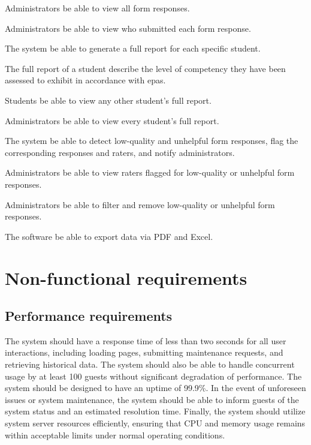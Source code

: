 \documentclass[letterpaper,article,oneside]{memoir}
\begin{document}
\begin{requirements}
   Administrators  be able to view all \glspl{form response}.
   \dep{\ref{req:r3}}
  
   Administrators  be able to view who submitted each \gls{form response}.
   \dep{\ref{req:a1}}

   The system  be able to generate a full report for each specific \gls{student}.
   \dep{\ref{req:r3}}

   The full report of a student  describe the level of \gls{competency} they have been assessed to exhibit in accordance with \glspl{epa}.
   \dep{\ref{req:r3}, \ref{req:s1}}

   Students  be able to view any other \gls{student}'s full report.
   \dep{\ref{req:s1}}

   Administrators  be able to view every \gls{student}'s full report.
   \dep{\ref{req:s1}}

   The system  be able to detect low-quality and unhelpful \glspl{form response}, flag the corresponding responses and \glspl{rater}, and notify administrators.
   \dep{\ref{req:r3}}

   Administrators  be able to view \glspl{rater} flagged for low-quality or unhelpful \glspl{form response}.

   Administrators  be able to filter and remove low-quality or unhelpful \glspl{form response}.
   \dep{\ref{req:a5}}

   The software  be able to export data via PDF and Excel.
   \dep{\ref{req:r3}}
\end{requirements}

\section{Non-functional requirements}

\subsection{Performance requirements}
The system should have a response time of less than two seconds for all user interactions, including loading pages, submitting maintenance requests, and retrieving historical data.
The system should also be able to handle concurrent usage by at least 100 guests without significant degradation of performance.
The system should be designed to have an uptime of 99.9\%.
In the event of unforeseen issues or system maintenance, the system should be able to inform guests of the system status and an estimated resolution time.
Finally, the system should utilize system server resources efficiently, ensuring that CPU and memory usage remains within acceptable limits under normal operating conditions.
\end{document}
